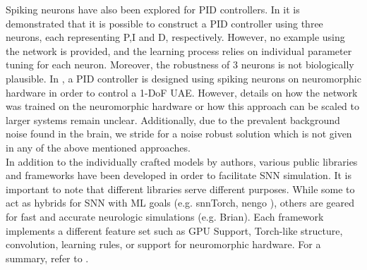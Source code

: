 Spiking neurons have also been explored for PID controllers. In \cite{lu_spiking_2011} it is demonstrated that it is possible to construct a PID controller using three neurons, each representing P,I and D, respectively. However, no example using the network is provided, and the learning process relies on individual parameter tuning for each neuron. Moreover, the robustness of 3 neurons is not biologically plausible. In \cite{stagsted_towards_2020}, a PID controller is designed using spiking neurons on neuromorphic hardware in order to control a 1-DoF UAE. However, details on how the network was trained on the neuromorphic hardware or how this approach can be scaled to larger systems remain unclear. Additionally, due to the prevalent background noise found in the brain, we stride for a noise robust solution which is not given in any of the above mentioned approaches.\\

In addition to the individually crafted models by authors, various public libraries and frameworks have been developed in order to facilitate \ac{SNN} simulation. It is important to note that different libraries serve different purposes. While some to act as hybrids for \ac{SNN} with \ac{ML} goals (e.g. snnTorch\cite{eshraghian_training_2023}, nengo \cite{bekolay_nengo_2014}), others are geared for fast and accurate neurologic simulations (e.g. Brian\cite{stimberg_brian_2019}). Each framework implements a different feature set such as \ac{GPU} Support, Torch-like structure, convolution, learning rules, or support for neuromorphic hardware. For a summary, refer to  \cite{yamazaki_spiking_2022}.

